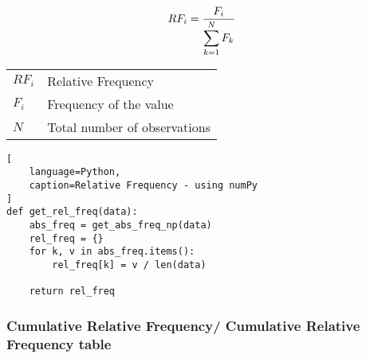 \begin{table}[H]
    \begin{minipage}{0.3\linewidth}
        \[
            \begin{aligned}
                RF_i
                    &= \dfrac{F_{i}}{\displaystyle\sum_{k=1}^{N} F_{k}}
            \end{aligned}
        \]
    \end{minipage}
    \begin{minipage}{0.65\linewidth}
        \begin{table}[H]
            \begin{tabular}{l l}
                $RF_i$ & Relative Frequency \\
                $F_i$ & Frequency of the value \\
                $N$ & Total number of observations \\
            \end{tabular}
        \end{table}
    \end{minipage}
\end{table}


\begin{lstlisting}[
    language=Python,
    caption=Relative Frequency - using numPy
]
def get_rel_freq(data):
    abs_freq = get_abs_freq_np(data)
    rel_freq = {}
    for k, v in abs_freq.items():
        rel_freq[k] = v / len(data)

    return rel_freq
\end{lstlisting}


\subsubsection{Cumulative Relative Frequency/ Cumulative Relative Frequency table \cite{statistics/book/Statistics-for-Data-Scientists/Maurits-Kaptein}}\label{Data/Describing Data/Frequency or Frequency table/Cumulative Relative}

